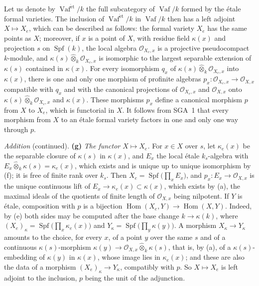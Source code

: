 
Let us denote by \(\operatorname{Vaf}^{\mathrm{\acute{e}t}}/k\) the full
subcategory of \(\operatorname{Vaf}/k\) formed by the étale formal
varieties. The inclusion of \(\operatorname{Vaf}^{\mathrm{\acute{e}t}}/k\)
in \(\operatorname{Vaf}/k\) then has a left adjoint \(X\mapsto X_e\),
which can be described as follows: the formal variety \(X_e\) has the
same points as \(X\); moreover, if \(x\) is a point of \(X\), with
residue field \(\kappa(x)\) and projection \(s\) on
\(\operatorname{Spf}(k)\), the local algebra \(\mathcal O_{X_e,x}\) is
a projective pseudocompact \(k\)-module, and
\(\kappa(s)\widehat\otimes_k\mathcal O_{X_e,x}\) is isomorphic to the
largest separable extension of \(\kappa(s)\) contained in
\(\kappa(x)\). For every isomorphism \(q_x\) of
\(\kappa(s)\widehat\otimes_k\mathcal O_{X_e,x}\) into \(\kappa(x)\),
there is one and only one morphism of profinite algebras
\(p_x:\mathcal O_{X_e,x}\to\mathcal O_{X,x}\) compatible with \(q_x\)
and with the canonical projections of \(\mathcal O_{X_e,x}\) and
\(\mathcal O_{X,x}\) onto
\(\kappa(s)\widehat\otimes_k\mathcal O_{X_e,x}\) and \(\kappa(x)\).
These morphisms \(p_x\) define a canonical morphism \(p\) from \(X\) to
\(X_e\), which is functorial in \(X\). It follows from SGA~1 that every
morphism from \(X\) to an étale formal variety factors in one and only
one way through \(p\).

\medskip\noindent
\emph{Addition} (continued).
\label{sga3:VIIB:1.6.F}
\textbf{(g)} \emph{The functor \(X\mapsto X_e\).} For \(x\in X\) over
\(s\), let \(\kappa_e(x)\) be the separable closure of \(\kappa(s)\)
in \(\kappa(x)\), and \(E_x\) the local étale \(k_s\)-algebra with
\(E_x\widehat\otimes_k\kappa(s)=\kappa_e(x)\), which exists and is
unique up to unique isomorphism by \textup{(f)}; it is free of finite
rank over \(k_s\). Then \(X_e=\operatorname{Spf}\bigl(\prod_xE_x\bigr)\),
and \(p_x:E_x\to\mathcal O_{X,x}\) is the unique continuous lift of
\(E_x\to\kappa_e(x)\subset\kappa(x)\), which exists by \textup{(a)}, the
maximal ideals of the quotients of finite length of
\(\mathcal O_{X,x}\) being nilpotent. If \(Y\) is étale, composition
with \(p\) is a bijection
\(\operatorname{Hom}(X_e,Y)\to\operatorname{Hom}(X,Y)\). Indeed, by
\textup{(e)} both sides may be computed after the base change
\(k\to\kappa(k)\), where
\((X_e)_\kappa=\operatorname{Spf}\bigl(\prod_x\kappa_e(x)\bigr)\) and
\(Y_\kappa=\operatorname{Spf}\bigl(\prod_y\kappa(y)\bigr)\). A morphism
\(X_\kappa\to Y_\kappa\) amounts to the choice, for every \(x\), of a
point \(y\) over the same \(s\) and of a continuous
\(\kappa(s)\)-morphism
\(\kappa(y)\to\mathcal O_{X,x}\widehat\otimes_k\kappa(s)\), that is, by
\textup{(a)}, of a \(\kappa(s)\)-embedding of \(\kappa(y)\) in
\(\kappa(x)\), whose image lies in \(\kappa_e(x)\); and these are also
the data of a morphism \((X_e)_\kappa\to Y_\kappa\), compatibly with
\(p\). So \(X\mapsto X_e\) is left adjoint to the inclusion, \(p\)
being the unit of the adjunction.

